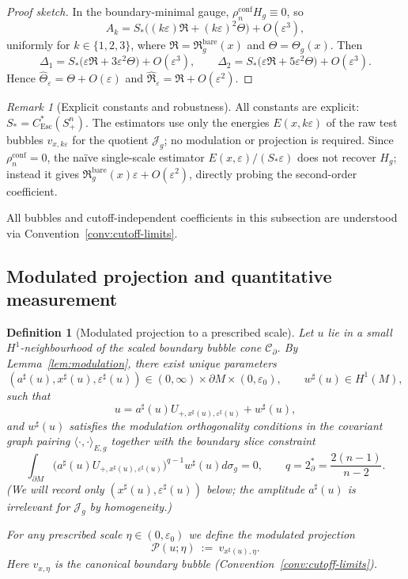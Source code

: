 \documentclass[11pt,reqno,a4paper]{amsart}
\numberwithin{equation}{section}
\theoremstyle{plain}
\newtheorem{definition}[theorem]{Definition}
\theoremstyle{remark}
\newtheorem{remark}[theorem]{Remark}
\theoremstyle{plain}
\begin{document}
\begin{proof}[Proof sketch]
In the boundary-minimal gauge, $\rho_n^{\mathrm{conf}}H_g\equiv0$, so
\[
A_k=S_\ast\big((k\varepsilon)\mathfrak R+(k\varepsilon)^2\Theta\big)+O(\varepsilon^3),
\]
uniformly for $k\in\{1,2,3\}$, where $\mathfrak R=\mathfrak R_g^{\mathrm{bare}}(x)$ and $\Theta=\Theta_g(x)$. Then
\[
\Delta_1=S_\ast\big(\varepsilon\mathfrak R+3\varepsilon^2\Theta\big)+O(\varepsilon^3),\qquad
\Delta_2=S_\ast\big(\varepsilon\mathfrak R+5\varepsilon^2\Theta\big)+O(\varepsilon^3).
\]
Hence
$\widehat\Theta_\varepsilon=\Theta+O(\varepsilon)$
and
$\widehat{\mathfrak R}_\varepsilon=\mathfrak R+O(\varepsilon^2)$.
\end{proof}

\begin{remark}[Explicit constants and robustness]\label{remark:Explicit_constant}
All constants are explicit: $S_\ast=C_{\mathrm{Esc}}^*(S^n_+)$. The estimators use only the energies $E(x,k\varepsilon)$ of the raw test bubbles $v_{x,k\varepsilon}$ for the quotient $\mathcal J_g$; no modulation or projection is required.
Since $\rho_n^{\mathrm{conf}}=0$, the na\"ive single-scale estimator $E(x,\varepsilon)/(S_\ast\varepsilon)$ does not recover $H_g$; instead it gives $\mathfrak R_g^{\mathrm{bare}}(x)\varepsilon + O(\varepsilon^2)$, directly probing the second-order coefficient.
\end{remark}


All bubbles and cutoff-independent coefficients in this subsection
are understood via Convention~\ref{conv:cutoff-limits}.


\subsection{Modulated projection and quantitative measurement}

\begin{definition}[Modulated projection to a prescribed scale]
Let $u$ lie in a small $H^1$-neighbourhood of the scaled boundary bubble cone $\mathcal C_\partial$.
By Lemma~\ref{lem:modulation}, there exist unique parameters
\[
(a^\sharp(u),x^\sharp(u),\varepsilon^\sharp(u))\in (0,\infty)\times \partial M\times(0,\varepsilon_0),\qquad
w^\sharp(u)\in H^1(M),
\]
such that
\[
u = a^\sharp(u)U_{+,x^\sharp(u),\varepsilon^\sharp(u)} + w^\sharp(u),
\]
and $w^\sharp(u)$ satisfies the modulation orthogonality conditions in the covariant graph pairing
$\langle\cdot,\cdot\rangle_{E,g}$ together with the boundary slice constraint
\[
\int_{\partial M}\big(a^\sharp(u)U_{+,x^\sharp(u),\varepsilon^\sharp(u)}\big)^{q-1}w^\sharp(u)d\sigma_g =0,
\qquad q=2^*_\partial=\frac{2(n-1)}{n-2}.
\]
(We will record only $(x^\sharp(u),\varepsilon^\sharp(u))$ below; the amplitude $a^\sharp(u)$ is irrelevant for
$\mathcal J_g$ by homogeneity.)

For any prescribed scale $\eta\in(0,\varepsilon_0)$ we define the \emph{modulated projection}
\[
\mathcal P(u;\eta)\ :=\ v_{x^\sharp(u),\eta}.
\]
Here $v_{x,\eta}$ is the canonical boundary bubble (Convention~\ref{conv:cutoff-limits}).
\end{definition}
\end{document}
